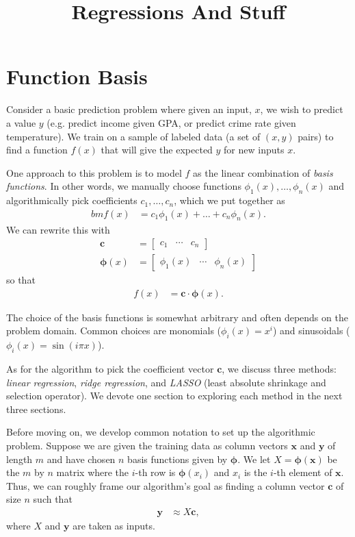 \documentclass[10pt]{paper}
\title{Regressions And Stuff}
\begin{document}
\maketitle

\section{Function Basis}
Consider a basic prediction problem where given an input, $x$, we wish to predict a value $y$ (e.g. predict income given GPA, or predict crime rate given temperature). We train on a sample of labeled data (a set of $(x,y)$ pairs) to find a function $f(x)$ that will give the expected $y$ for new inputs $x$.

One approach to this problem is to model $f$ as the linear combination of \emph{basis functions}. In other words, we manually choose functions $\phi_1(x), \dots, \phi_n(x)$ and algorithmically pick coefficients $c_1, \dots, c_n$, which we put together as
\begin{align*}bm
f(x) &= c_1 \phi_1(x) + \dots + c_n \phi_n(x).
\end{align*}
We can rewrite this with 
\begin{align*}
\bm{c} &= \begin{bmatrix} c_1 & \cdots & c_n \end{bmatrix} \\
\bm{\phi}(x) &= \begin{bmatrix} \phi_1(x) & \cdots & \phi_n(x) \end{bmatrix}
\end{align*}
so that 
\begin{align}
f(x) &= \bm{c} \cdot \bm{\phi}(x). \label{eq:predictor}
\end{align}

The choice of the basis functions is somewhat arbitrary and often depends on the problem domain. Common choices are monomials ($\phi_i(x) = x^i$) and sinusoidals ($\phi_i(x) = \sin(i \pi x)$).

As for the algorithm to pick the coefficient vector $\bm{c}$, we discuss three methods: \emph{linear regression}, \emph{ridge regression}, and \emph{LASSO} (least absolute shrinkage and selection operator). We devote one section to exploring each method in the next three sections.

Before moving on, we develop common notation to set up the algorithmic problem. Suppose we are given the training data as column vectors $\bm{x}$ and $\bm{y}$ of length $m$ and have chosen $n$ basis functions given by $\bm{\phi}$. We let $X = \bm{\phi}(\bm{x})$ be the $m$ by $n$ matrix where the $i$-th row is $\bm{\phi}(x_i)$ and $x_i$ is the $i$-th element of $\bm{x}$. Thus, we can roughly frame our algorithm's goal as finding a column vector $\bm{c}$ of size $n$ such that
\begin{align}
\bm{y} &\approx X \bm{c}, \label{eq:problem}
\end{align}
where $X$ and $\bm{y}$ are taken as inputs.
\end{document}
